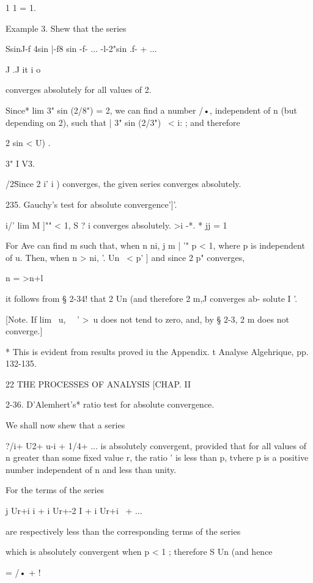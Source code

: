 1 1 = 1. 

Example 3. Shew that the series 

SsinJ-f 4sin |-f8 sin  -f- ... -l-2"sin .f- + ... 

 J .J it i o 

converges absolutely for all values of 2. 

Since* lim 3" sin (2/8") = 2, we can find a number /•, independent of n (but depending 
on 2), such that | 3" sin (2/3") \ < i: ; and therefore 

2 sin  < U) . 



3" I V3. 

  /2\" 
Since 2 i' i ) converges, the given series converges absolutely. 

235. Gauchy's test for absolute convergence']'. 

i/' lim M  ]"" < 1, S ? i converges absolutely. 
>i -*. * jj = 1 

For Ave can find m such that, when n ni, j m  | '"  p < 1, where p is 
independent of u. Then, when n > ni, '. Un \ <  p' ] and since 2 p" converges, 

n = >n+l 

it follows from § 2-34! that 2 Un (and therefore 2 m,J converges ab- 
solute I '. 

[Note. If lim \ u, \ \  ' >\, u  does not tend to zero, and, by § 2-3, 2 m  does not 
converge.] 

* This is evident from results proved iu the Appendix. 
t Analyse Algehrique, pp. 132-135. 



22 THE PROCESSES OF ANALYSIS [CHAP. II 

2-36. D'Alemhert's* ratio test for absolute convergence. 

We shall now shew that a series 

?/i+ U2+ u-i + 1/4+ ... 
is absolutely convergent, provided that for all values of n greater than some 
fixed value r, the ratio '   is less than p, tvhere p is a positive number 
independent of n and less than unity. 

For the terms of the series 

j Ur+i i + i Ur+-2 I + i Ur+i \ + ... 

are respectively less than the corresponding terms of the series 

which is absolutely convergent when p < 1 ; therefore S Un (and hence 

  = /• + ! 

